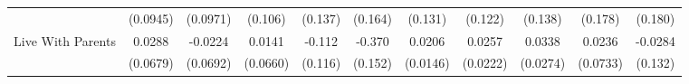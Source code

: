 {\begin{tabular}{l*{10}{c}}
            &    (0.0945)         &    (0.0971)         &     (0.106)         &     (0.137)         &     (0.164)         &     (0.131)         &     (0.122)         &     (0.138)         &     (0.178)         &     (0.180)         \\
\addlinespace
Live With Parents&      0.0288         &     -0.0224         &      0.0141         &      -0.112         &      -0.370\sym{*}  &      0.0206         &      0.0257         &      0.0338         &      0.0236         &     -0.0284         \\
            &    (0.0679)         &    (0.0692)         &    (0.0660)         &     (0.116)         &     (0.152)         &    (0.0146)         &    (0.0222)         &    (0.0274)         &    (0.0733)         &     (0.132)         \\
\bottomrule
\end{tabular}
}

